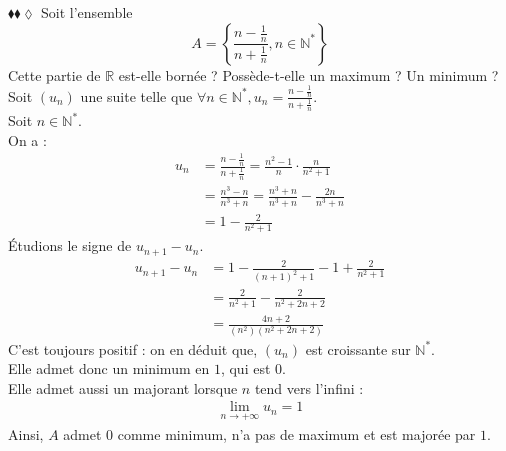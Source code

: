 \documentclass[11pt]{article}
\begin{document}
\begin{exercice}{$\blacklozenge\blacklozenge\lozenge$}{}
    Soit l'ensemble 
    \begin{equation*}
        A = \left\{\frac{ n-\frac{1}{n} }{ n+\frac{1}{n}}, n\in\mathbb{N}^* \right\}
    \end{equation*}
    Cette partie de $\mathbb{R}$ est-elle bornée ? Possède-t-elle un maximum ? Un minimum ?
    \tcblower
    Soit $(u_n)$ une suite telle que $\forall{n\in\mathbb{N}^*}, u_n=\frac{n-\frac{1}{n}}{n+\frac{1}{n}}$.\\
    Soit $n\in\mathbb{N}^*$.\\
    On a :
    \begin{align*}
        u_n 
        &= \frac{n-\frac{1}{n}}{n+\frac{1}{n}} = \frac{n^2-1}{n} \cdot \frac{n}{n^2+1}\\
        &= \frac{n^3-n}{n^3+n} = \frac{n^3+n}{n^3+n}-\frac{2n}{n^3+n}\\
        &= 1 - \frac{2}{n^2+1}
    \end{align*}
    Étudions le signe de $u_{n+1}-u_n$.
    \begin{align*}
        u_{n+1}-u_n
        &= 1 - \frac{2}{(n+1)^2+1}-1+\frac{2}{n^2+1}\\
        &= \frac{2}{n^2+1} - \frac{2}{n^2+2n+2}\\
        &= \frac{4n+2}{(n^2)(n^2+2n+2)}
    \end{align*}
    C'est toujours positif : on en déduit que, $(u_n)$ est croissante sur $\mathbb{N}^*$.\\
    Elle admet donc un minimum en $1$, qui est $0$.\\
    Elle admet aussi un majorant lorsque $n$ tend vers l'infini :
    \begin{align*}
        \lim_{n\rightarrow+\infty}u_n=1
    \end{align*}
    Ainsi, $A$ admet $0$ comme minimum, n'a pas de maximum et est majorée par $1$.
\end{exercice}
\end{document}

